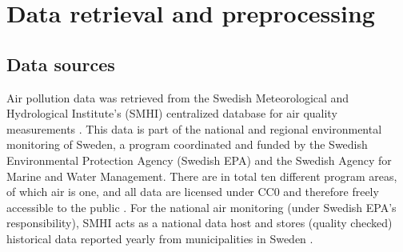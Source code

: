 %



\section{Data retrieval and preprocessing}
\label{chap:dataprocesschap}

\subsection{Data sources}
\label{sec:data-sources}

Air pollution data was retrieved from the Swedish Meteorological and Hydrological Institute's (SMHI) centralized database for air quality measurements \cite{smhi-luftmatningar}. This data is part of the national and regional environmental monitoring of Sweden, a program coordinated and funded by the Swedish Environmental Protection Agency (Swedish EPA) and the Swedish Agency for Marine and Water Management. There are in total ten different program areas, of which air is one, and all data are licensed under CC0 and therefore freely accessible to the public \cite{naturvardsverket-miljodata}. For the national air monitoring (under Swedish EPA's responsibility), SMHI acts as a national data host and stores (quality checked) historical data reported yearly from municipalities in Sweden \cite{smhi-luftmatningar}.

